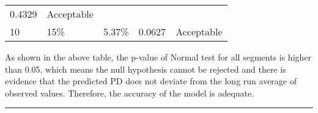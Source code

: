 \begin{longtable}[]{@{}lllll@{}}
\begin{minipage}[t]{0.19\columnwidth}
0.4329\strut
\end{minipage} & \begin{minipage}[t]{0.18\columnwidth}\raggedright
Acceptable\strut
\end{minipage}\tabularnewline
\begin{minipage}[t]{0.12\columnwidth}\raggedright
10\strut
\end{minipage} & \begin{minipage}[t]{0.26\columnwidth}\raggedright
15\%\strut
\end{minipage} & \begin{minipage}[t]{0.12\columnwidth}\raggedright
5.37\%\strut
\end{minipage} & \begin{minipage}[t]{0.19\columnwidth}\raggedright
0.0627\strut
\end{minipage} & \begin{minipage}[t]{0.18\columnwidth}\raggedright
Acceptable\strut
\end{minipage}\tabularnewline
\bottomrule
\end{longtable}

As shown in the above table, the p-value of Normal test for all segments
is higher than 0.05, which means the null hypothesis cannot be rejected
and there is evidence that the predicted PD does not deviate from the
long run average of observed values. Therefore, the accuracy of the
model is adequate.

\begin{center}\rule{0.5\linewidth}{\linethickness}\end{center}
